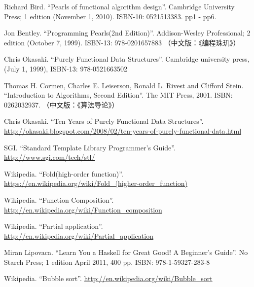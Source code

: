 
\begin{thebibliography}{99}


Richard Bird. ``Pearls of functional algorithm design''. Cambridge University Press; 1 edition (November 1, 2010). ISBN-10: 0521513383. pp1 - pp6.

Jon Bentley. ``Programming Pearls(2nd Edition)''. Addison-Wesley Professional; 2 edition (October 7, 1999). ISBN-13: 978-0201657883 （中文版：《编程珠玑》）

Chris Okasaki. ``Purely Functional Data Structures''. Cambridge university press, (July 1, 1999), ISBN-13: 978-0521663502

Thomas H. Cormen, Charles E. Leiserson, Ronald L. Rivest and Clifford Stein. ``Introduction to Algorithms, Second Edition''. The MIT Press, 2001. ISBN: 0262032937. （中文版：《算法导论》）


Chris Okasaki. ``Ten Years of Purely Functional Data Structures''. \url{http://okasaki.blogspot.com/2008/02/ten-years-of-purely-functional-data.html}

SGI. ``Standard Template Library Programmer's Guide''. \url{http://www.sgi.com/tech/stl/}


Wikipedia. ``Fold(high-order function)''. \url{https://en.wikipedia.org/wiki/Fold_(higher-order_function)}

Wikipedia. ``Function Composition''. \url{http://en.wikipedia.org/wiki/Function_composition}

Wikipedia. ``Partial application''. \url{http://en.wikipedia.org/wiki/Partial_application}

Miran Lipovaca. ``Learn You a Haskell for Great Good! A Beginner's Guide''. No Starch Press; 1 edition April 2011, 400 pp. ISBN: 978-1-59327-283-8

Wikipedia. ``Bubble sort''. \url{http://en.wikipedia.org/wiki/Bubble_sort}


\end{thebibliography}
